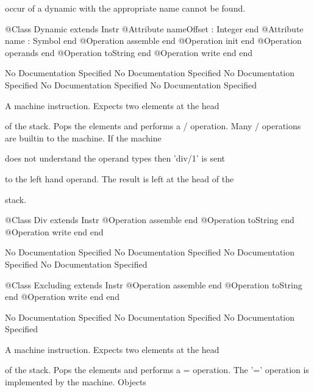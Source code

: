       occur of a dynamic with the appropriate name cannot be found.
\begin{Interface}
@Class Dynamic extends Instr
  @Attribute nameOffset : Integer end
  @Attribute name : Symbol end
  @Operation assemble end
  @Operation init end
  @Operation operands end
  @Operation toString end
  @Operation write end
end
\end{Interface}
No Documentation Specified
No Documentation Specified
No Documentation Specified
No Documentation Specified
No Documentation Specified

      A machine instruction. Expects two elements at the head

      of the stack. Pops the elements and performs a / operation.
      Many / operations are builtin to the machine. If the machine

      does not understand the operand types then 'div/1' is sent

      to the left hand operand. The result is left at the head of the

      stack.
\begin{Interface}
@Class Div extends Instr
  @Operation assemble end
  @Operation toString end
  @Operation write end
end
\end{Interface}
No Documentation Specified
No Documentation Specified
No Documentation Specified
No Documentation Specified
\begin{Interface}
@Class Excluding extends Instr
  @Operation assemble end
  @Operation toString end
  @Operation write end
end
\end{Interface}
No Documentation Specified
No Documentation Specified
No Documentation Specified

      A machine instruction. Expects two elements at the head

      of the stack. Pops the elements and performs a = operation.
      The '=' operation is implemented by the machine. Objects


